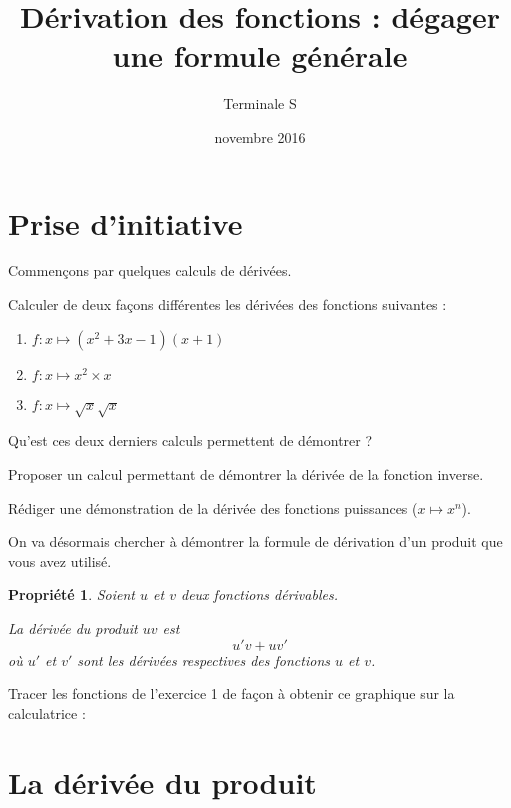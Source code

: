 \documentclass[12pt,a4paper,french]{article}
\title{Dérivation des fonctions : dégager une formule générale}
\author{Terminale S}
\date{novembre 2016}
\makeatletter
\renewcommand{\maketitle}%
{\framebox{%
    \begin{minipage}{1.0\linewidth}%
      \begin{center}%
        \Large \@title ~-- \@author \\%
        \@date%
      \end{center}%
    \end{minipage}}%
  \normalsize%
}
\theoremstyle{break}
\newtheorem{propriete}{Propriété}
\theoremstyle{plain}
\theoremstyle{nonumberplain}
\theoremstyle{nonumberbreak}
\makeatother
\begin{document}
\maketitle

\section{Prise d'initiative}

Commençons par quelques calculs de dérivées.

\begin{question}
  Calculer de deux façons différentes les dérivées des fonctions
  suivantes :
  \begin{enumerate}
    \item $f:x\mapsto (x^2 + 3x -1)(x + 1)$
    \item $f:x\mapsto x^2\times x$
    \item $f:x\mapsto \sqrt{x}\sqrt{x}$
  \end{enumerate}
\end{question}

Qu'est ces deux derniers calculs permettent de démontrer ?

Proposer un calcul permettant de démontrer la dérivée de la fonction
inverse.

Rédiger une démonstration de la dérivée des fonctions puissances
($x\mapsto x^n$).

On va désormais chercher à démontrer la formule de dérivation d'un
produit que vous avez utilisé.

\begin{propriete}
  Soient $u$ et $v$ deux fonctions dérivables.

  La dérivée du produit $uv$ est \[u'v + uv'\] où $u'$ et $v'$ sont les
  dérivées respectives des fonctions $u$ et $v$.
\end{propriete}

Tracer les fonctions de l'exercice 1 de façon à obtenir ce graphique sur
la calculatrice :
\begin{center}
\end{center}


\pagebreak
\section{La dérivée du produit}
\end{document}
